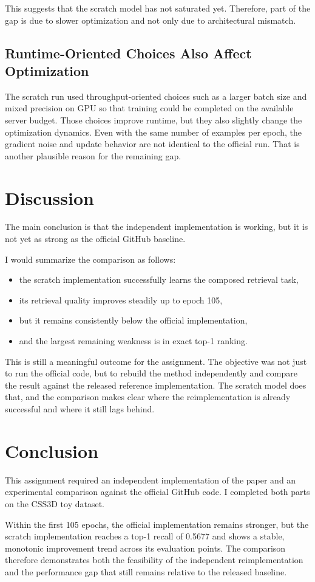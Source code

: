 \documentclass[11pt]{article}
\begin{document}
This suggests that the scratch model has not saturated yet. Therefore, part of the gap is due to slower optimization and not only due to architectural mismatch.

\subsection{Runtime-Oriented Choices Also Affect Optimization}
The scratch run used throughput-oriented choices such as a larger batch size and mixed precision on GPU so that training could be completed on the available server budget. Those choices improve runtime, but they also slightly change the optimization dynamics. Even with the same number of examples per epoch, the gradient noise and update behavior are not identical to the official run. That is another plausible reason for the remaining gap.

\section{Discussion}
The main conclusion is that the independent implementation is working, but it is not yet as strong as the official GitHub baseline.

I would summarize the comparison as follows:
\begin{itemize}[leftmargin=*]
  \item the scratch implementation successfully learns the composed retrieval task,
  \item its retrieval quality improves steadily up to epoch 105,
  \item but it remains consistently below the official implementation,
  \item and the largest remaining weakness is in exact top-1 ranking.
\end{itemize}

This is still a meaningful outcome for the assignment. The objective was not just to run the official code, but to rebuild the method independently and compare the result against the released reference implementation. The scratch model does that, and the comparison makes clear where the reimplementation is already successful and where it still lags behind.

\section{Conclusion}
This assignment required an independent implementation of the paper and an experimental comparison against the official GitHub code. I completed both parts on the CSS3D toy dataset.

Within the first 105 epochs, the official implementation remains stronger, but the scratch implementation reaches a top-1 recall of 0.5677 and shows a stable, monotonic improvement trend across its evaluation points. The comparison therefore demonstrates both the feasibility of the independent reimplementation and the performance gap that still remains relative to the released baseline.
\end{document}
